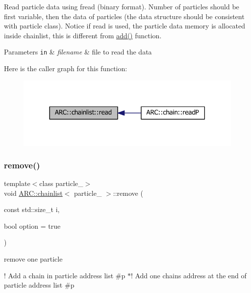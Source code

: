 Read particle data using fread (binary format). Number of particles should be first variable, then the data of particles (the data structure should be consistent with particle class). Notice if read is used, the particle data memory is allocated inside chainlist, this is different from \hyperlink{classARC_1_1chainlist_a598c1819d8e715ec0a24669e5bb06c6a}{add()} function. 
\begin{DoxyParams}[1]{Parameters}
\mbox{\tt in}  & {\em filename} & file to read the data \\
\hline
\end{DoxyParams}
Here is the caller graph for this function\+:
\nopagebreak
\begin{figure}[H]
\begin{center}
\leavevmode
\includegraphics[width=317pt]{classARC_1_1chainlist_adfa67e2ccdbdfd7ed945fa7617f90ecc_icgraph}
\end{center}
\end{figure}
\hypertarget{classARC_1_1chainlist_adcf73b53ad0da50299f4ef3f5fefae04}{}\label{classARC_1_1chainlist_adcf73b53ad0da50299f4ef3f5fefae04} 
\subsubsection{\texorpdfstring{remove()}{remove()}}
{\footnotesize\ttfamily template$<$class particle\+\_\+$>$ \\
void \hyperlink{classARC_1_1chainlist}{A\+R\+C\+::chainlist}$<$ particle\+\_\+ $>$\+::remove (\begin{DoxyParamCaption}\item[{const std\+::size\+\_\+t}]{i,  }\item[{bool}]{option = {\ttfamily true} }\end{DoxyParamCaption})\hspace{0.3cm}{\ttfamily [inline]}}



remove one particle 

! Add a chain in particle address list \#p $\ast$! Add one chain\textquotesingle{}s address at the end of particle address list \#p

